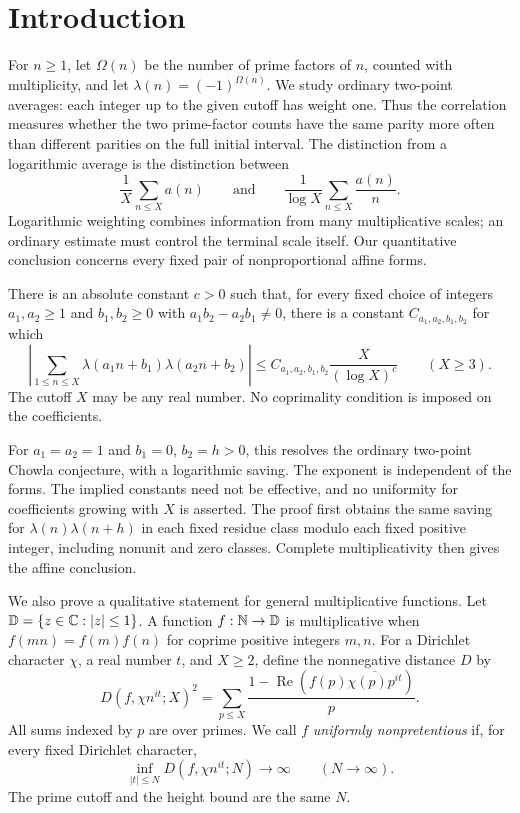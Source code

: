 \section{Introduction}\label{sec:introduction}

For \(n\ge1\), let \(\Omega(n)\) be the number of prime factors of \(n\),
counted with multiplicity, and let \(\lambda(n)=(-1)^{\Omega(n)}\).
We study ordinary two-point averages: each integer up to the given
cutoff has weight one. Thus the correlation measures whether the two prime-factor counts
have the same parity more often than different parities on the full
initial interval.
The distinction from a logarithmic average is the distinction between
\[
 \frac1X\sum_{n\le X}a(n)
 \qquad\text{and}\qquad
 \frac1{\log X}\sum_{n\le X}\frac{a(n)}n.
\]
Logarithmic weighting combines information from many multiplicative
scales; an ordinary estimate must control the terminal scale itself.
Our quantitative conclusion concerns every fixed pair of
nonproportional affine forms.

\begin{theorem}
\label{thm:q-affine}
There is an absolute constant \(c>0\) such that, for every fixed choice
of integers \(a_1,a_2\ge1\) and \(b_1,b_2\ge0\) with
\(a_1b_2-a_2b_1\ne0\), there is a constant
\(C_{a_1,a_2,b_1,b_2}\) for which
\[
 \left|\sum_{1\le n\le X}
       \lambda(a_1n+b_1)\lambda(a_2n+b_2)\right|
 \le C_{a_1,a_2,b_1,b_2}\frac{X}{(\log X)^c}
 \qquad(X\ge3).
\]
The cutoff \(X\) may be any real number. No coprimality condition is
imposed on the coefficients.
\end{theorem}

For $a_1=a_2=1$ and $b_1=0$, $b_2=h>0$, this resolves the
ordinary two-point Chowla conjecture, with a logarithmic saving.
The exponent is independent of the forms. The implied constants need
not be effective, and no uniformity for coefficients growing with \(X\)
is asserted. The proof first obtains the same saving for
\(\lambda(n)\lambda(n+h)\) in each fixed residue class modulo each fixed
positive integer, including nonunit and zero classes. Complete
multiplicativity then gives the affine conclusion.

We also prove a qualitative statement for general multiplicative
functions. Let \(\mathbb D=\{z\in\mathbb C:|z|\le1\}\). A function
\(f:\mathbb N\to\mathbb D\) is multiplicative when
\(f(mn)=f(m)f(n)\) for coprime positive integers \(m,n\).
For a Dirichlet character \(\chi\), a real number \(t\), and \(X\ge2\),
define the nonnegative distance \(D\) by
\begin{equation}\label{eq:distance}
 D(f,\chi n^{it};X)^2
 =\sum_{p\le X}\frac{1-\operatorname{Re}
       (f(p)\overline{\chi(p)p^{it}})}p.
\end{equation}
All sums indexed by \(p\) are over primes. We call \(f\)
\emph{uniformly nonpretentious} if, for every fixed Dirichlet character,
\begin{equation}\label{eq:unp}
 \inf_{|t|\le N}D(f,\chi n^{it};N)\longrightarrow\infty
 \qquad(N\longrightarrow\infty).
\end{equation}
The prime cutoff and the height bound are the same \(N\).

